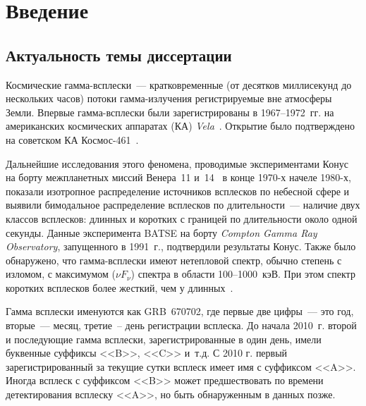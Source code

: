 \chapter*{Введение}					

\section*{Актуальность темы диссертации}

Космические гамма-всплески~--- кратковременные (от десятков миллисекунд до нескольких часов) 
потоки гамма-излучения регистрируемые вне атмосферы Земли. Впервые гамма-всплески 
были зарегистрированы в 1967--1972~гг. на американских космических аппаратах (КА) 
\textit{Vela}~\citep{Klebesadel_1973ApJ}. Открытие было подтверждено на советском
КА Космос-461~\citep{Mazets_1974PZETF_ru}. 

Дальнейшие исследования этого феномена, проводимые экспериментами Конус на борту 
межпланетных миссий Венера~11 и~14~\citep{Mazets_1981_part_1} в конце 1970-х начеле 1980-х, показали изотропное
распределение источников всплесков по небесной сфере и выявили бимодальное распределение
всплесков по длительности~--- наличие двух классов всплесков: длинных и коротких
с границей по длительности около одной секунды.
Данные эксперимента BATSE на борту \textit{Compton Gamma Ray Observatory}, запущенного 
в 1991~г., подтвердили результаты Конус. Также было обнаружено, что 
гамма-всплески имеют нетепловой спектр, обычно степень с изломом, с максимумом
($\nu F_{\nu}$) спектра в области 100--1000~кэВ. При этом спектр 
коротких всплесков более жесткий, чем у длинных~\citep{Kouveliotou_1993}. 

Гамма всплески именуются как GRB~670702,
где первые две цифры~--- это год, вторые~--- месяц, третие~-- день регистрации всплеска.
До начала 2010~г. второй и последующие гамма всплески, зарегистрированные в один день, имели 
буквенные суффиксы <<B>>, <<C>> и~т.д. С 2010 г. первый зарегистрированный за текущие сутки 
всплеск имеет имя с суффиксом <<A>>. Иногда всплеск с суффиксом <<B>> может предшествовать
по времени детектирования всплеску <<A>>, но быть обнаруженным в данных позже.


